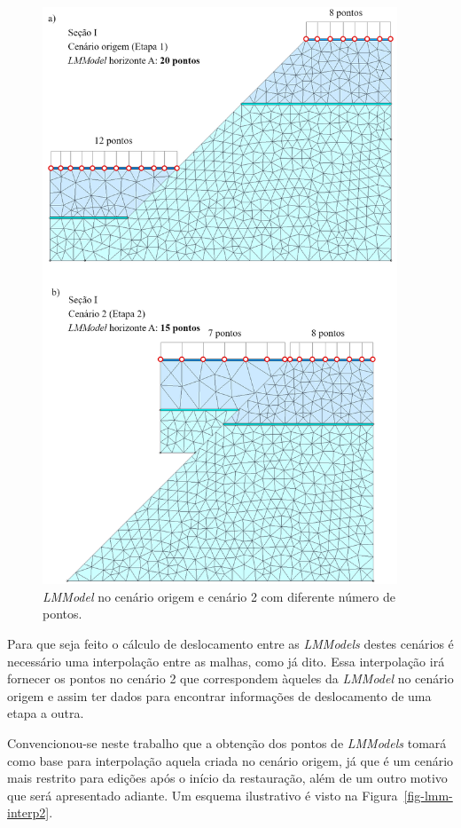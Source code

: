 \begin{figure} [H]
  \begin{center}
    \includegraphics[width=300pt]{images/fig-lmm-interp1}
    \caption{\textit{LMModel} no cenário origem e cenário 2 com diferente número de pontos.}\label{fig-lmm-interp1}
  \end{center}
\end{figure}

Para que seja feito o cálculo de deslocamento entre as \textit{LMModels} destes cenários é necessário uma interpolação entre as malhas, como já dito. Essa interpolação irá fornecer os pontos no cenário 2 que correspondem àqueles da \textit{LMModel} no cenário origem e assim ter dados para encontrar informações de deslocamento de uma etapa a outra.

Convencionou-se neste trabalho que a obtenção dos pontos de \textit{LMModels} tomará como base para interpolação aquela criada no cenário origem, já que é um cenário mais restrito para edições após o início da restauração, além de um outro motivo que será apresentado adiante. Um esquema ilustrativo é visto na Figura~\ref{fig-lmm-interp2}.


